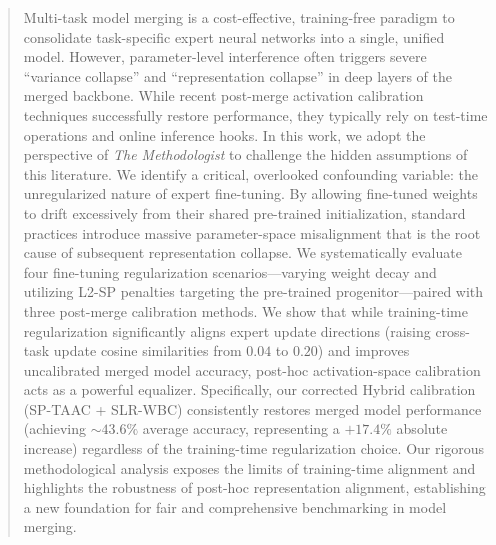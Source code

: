 \documentclass{article}
\theoremstyle{plain}
\theoremstyle{definition}
\theoremstyle{remark}
\begin{document}

\printAffiliationsAndNotice{\icmlEqualContribution}

\begin{abstract}
Multi-task model merging is a cost-effective, training-free paradigm to consolidate task-specific expert neural networks into a single, unified model. However, parameter-level interference often triggers severe ``variance collapse'' and ``representation collapse'' in deep layers of the merged backbone. While recent post-merge activation calibration techniques successfully restore performance, they typically rely on test-time operations and online inference hooks. In this work, we adopt the perspective of \textit{The Methodologist} to challenge the hidden assumptions of this literature. We identify a critical, overlooked confounding variable: the unregularized nature of expert fine-tuning. By allowing fine-tuned weights to drift excessively from their shared pre-trained initialization, standard practices introduce massive parameter-space misalignment that is the root cause of subsequent representation collapse. We systematically evaluate four fine-tuning regularization scenarios---varying weight decay and utilizing L2-SP penalties targeting the pre-trained progenitor---paired with three post-merge calibration methods. We show that while training-time regularization significantly aligns expert update directions (raising cross-task update cosine similarities from $0.04$ to $0.20$) and improves uncalibrated merged model accuracy, post-hoc activation-space calibration acts as a powerful equalizer. Specifically, our corrected Hybrid calibration (SP-TAAC + SLR-WBC) consistently restores merged model performance (achieving $\sim 43.6\%$ average accuracy, representing a $+17.4\%$ absolute increase) regardless of the training-time regularization choice. Our rigorous methodological analysis exposes the limits of training-time alignment and highlights the robustness of post-hoc representation alignment, establishing a new foundation for fair and comprehensive benchmarking in model merging.
\end{abstract}
\end{document}
